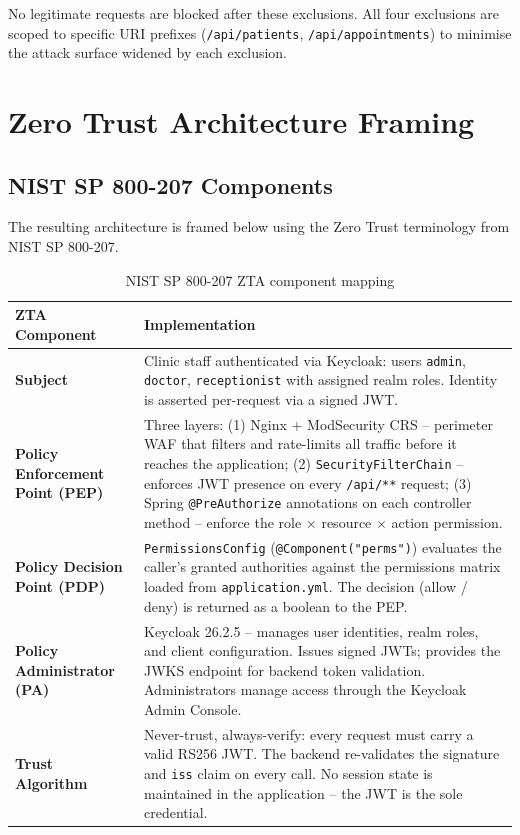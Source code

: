 \documentclass[12pt,a4paper]{report}
\begin{document}
No legitimate requests are blocked after these exclusions. All four exclusions are scoped to
specific URI prefixes (\texttt{/api/patients}, \texttt{/api/appointments}) to minimise the
attack surface widened by each exclusion.

\section{Zero Trust Architecture Framing}

\subsection{NIST SP 800-207 Components}

The resulting architecture is framed below using the Zero Trust terminology from NIST SP 800-207.

\begin{table}[H]
\centering
\caption{NIST SP 800-207 ZTA component mapping}
\begin{tabularx}{\linewidth}{l X}
\toprule
\textbf{ZTA Component} & \textbf{Implementation} \\
\midrule
\textbf{Subject} &
  Clinic staff authenticated via Keycloak: users \texttt{admin}, \texttt{doctor},
  \texttt{receptionist} with assigned realm roles. Identity is asserted per-request
  via a signed JWT. \\[6pt]

\textbf{Policy Enforcement Point (PEP)} &
  Three layers: (1) Nginx + ModSecurity CRS -- perimeter WAF that filters and rate-limits
  all traffic before it reaches the application; (2) \texttt{SecurityFilterChain} -- enforces
  JWT presence on every \texttt{/api/**} request; (3) Spring \texttt{@PreAuthorize} annotations
  on each controller method -- enforce the role $\times$ resource $\times$ action permission. \\[6pt]

\textbf{Policy Decision Point (PDP)} &
  \texttt{PermissionsConfig} (\texttt{@Component("perms")}) evaluates the caller's
  granted authorities against the permissions matrix loaded from \texttt{application.yml}.
  The decision (allow / deny) is returned as a boolean to the PEP. \\[6pt]

\textbf{Policy Administrator (PA)} &
  Keycloak 26.2.5 -- manages user identities, realm roles, and client configuration.
  Issues signed JWTs; provides the JWKS endpoint for backend token validation.
  Administrators manage access through the Keycloak Admin Console. \\[6pt]

\textbf{Trust Algorithm} &
  Never-trust, always-verify: every request must carry a valid RS256 JWT. The
  backend re-validates the signature and \texttt{iss} claim on every call.
  No session state is maintained in the application -- the JWT is the sole credential. \\
\bottomrule
\end{tabularx}
\end{table}
\end{document}
